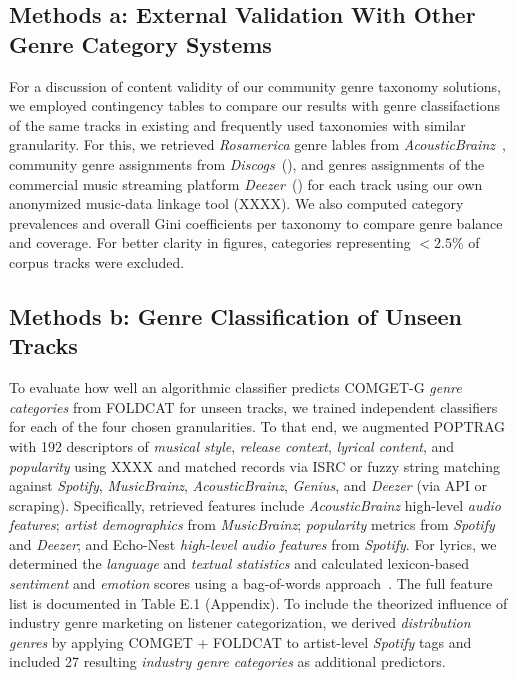 \documentclass{article}
\begin{document}
\subsection{Methods a: External Validation With Other Genre Category Systems}
For a discussion of content validity of our community genre taxonomy solutions, we employed contingency tables to compare our results with genre classifactions of the same tracks in existing and frequently used taxonomies with similar granularity. For this, we retrieved \textit{Rosamerica} genre lables from \textit{AcousticBrainz}~\citep{jimenez2020tensorflow}, community genre assignments from \textit{Discogs}~(\citeyear{Discogs2024}), and genres assignments of the commercial music streaming platform \textit{Deezer}~(\citeyear{Deezer_nodate}) for each track using our own anonymized music-data linkage tool (XXXX).
We also computed category prevalences and overall Gini coefficients per taxonomy to compare genre balance and coverage. For better clarity in figures, categories representing $<2.5\%$ of corpus tracks were excluded.

\subsection{Methods b: Genre Classification of Unseen Tracks}
To evaluate how well an algorithmic classifier predicts COMGET-G \textit{genre categories} from FOLDCAT for unseen tracks, we trained independent classifiers for each of the four chosen granularities. To that end, we augmented POPTRAG with 192 descriptors of \textit{musical style}, \textit{release context}, \textit{lyrical content}, and \textit{popularity} using XXXX %
and matched records via ISRC or fuzzy string matching against \textit{Spotify}, \textit{MusicBrainz}, \textit{AcousticBrainz}, \textit{Genius}, and \textit{Deezer} (via API or scraping). Specifically, retrieved features include \textit{AcousticBrainz} high-level \textit{audio features}; \textit{artist demographics} from \textit{MusicBrainz}; \textit{popularity} metrics from \textit{Spotify} and \textit{Deezer}; and Echo-Nest \textit{high-level audio features} from \textit{Spotify}. For lyrics, we determined the \textit{language} and \textit{textual statistics} and calculated lexicon-based \textit{sentiment} and \textit{emotion} scores using a bag-of-words approach~\citep{rinkerSentimentrCalculateText2021, Jockers2015-fv, Mohammad13}. The full feature list is documented in Table E.1 (Appendix). To include the theorized influence of industry genre marketing on listener categorization, we derived \textit{distribution genres} by applying COMGET + FOLDCAT to artist-level \textit{Spotify} tags and included 27 resulting \textit{industry genre categories} as additional predictors.  %
\end{document}
